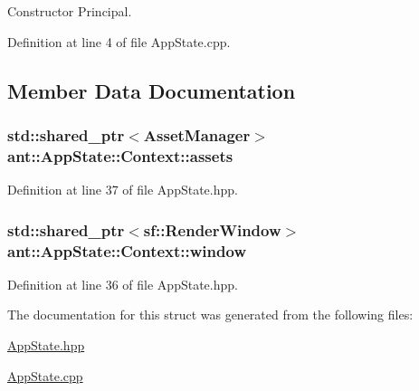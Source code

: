 Constructor Principal. 



Definition at line 4 of file App\+State.\+cpp.



\subsection{Member Data Documentation}
\hypertarget{structant_1_1_app_state_1_1_context_af678ddb7f0a97211689fc31ba94c881f}{
\subsubsection[{assets}]{\setlength{\rightskip}{0pt plus 5cm}std\+::shared\+\_\+ptr$<${\bf Asset\+Manager}$>$ ant\+::\+App\+State\+::\+Context\+::assets}}\label{structant_1_1_app_state_1_1_context_af678ddb7f0a97211689fc31ba94c881f}


Definition at line 37 of file App\+State.\+hpp.

\hypertarget{structant_1_1_app_state_1_1_context_ae91cf7291fa22557f71702ce1e5f2eb2}{
\subsubsection[{window}]{\setlength{\rightskip}{0pt plus 5cm}std\+::shared\+\_\+ptr$<$sf\+::\+Render\+Window$>$ ant\+::\+App\+State\+::\+Context\+::window}}\label{structant_1_1_app_state_1_1_context_ae91cf7291fa22557f71702ce1e5f2eb2}


Definition at line 36 of file App\+State.\+hpp.



The documentation for this struct was generated from the following files\+:\begin{DoxyCompactItemize}
\item 
\hyperlink{_app_state_8hpp}{App\+State.\+hpp}\item 
\hyperlink{_app_state_8cpp}{App\+State.\+cpp}\end{DoxyCompactItemize}
